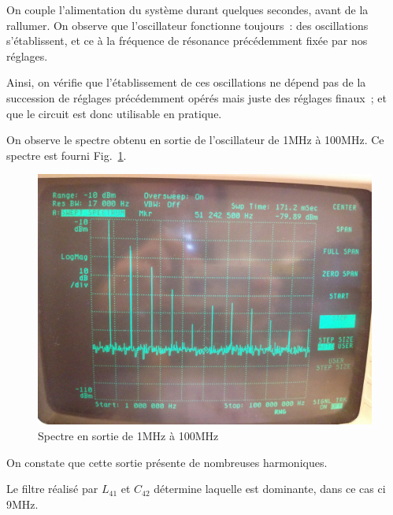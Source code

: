 \documentclass{article}
\begin{document}
On couple l'alimentation du système durant quelques secondes, avant de la rallumer. On observe que l'oscillateur fonctionne toujours~: des oscillations s'établissent, et ce à la fréquence de résonance précédemment fixée par nos réglages.

Ainsi, on vérifie que l'établissement de ces oscillations ne dépend pas de la succession de réglages précédemment opérés mais juste des réglages finaux~; et que le circuit est donc utilisable en pratique.



On observe le spectre obtenu en sortie de l'oscillateur de 1MHz à 100MHz. Ce spectre est fourni Fig.~\ref{fig:osc_quartz_spectre_large}.

\begin{figure}[h]
	\centering
	\includegraphics[width = 0.7\linewidth]{7_3_6_1MHz_100MHz.jpg}
	\caption{Spectre en sortie de 1MHz à 100MHz}
	\label{fig:osc_quartz_spectre_large}
\end{figure}

On constate que cette sortie présente de nombreuses harmoniques.




Le filtre réalisé par $L_{41}$ et $C_{42}$ détermine laquelle est dominante, dans ce cas ci 9MHz.
\end{document}
